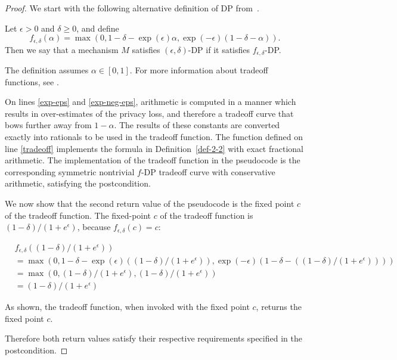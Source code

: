 \documentclass{article}
\begin{document}
\begin{proof}
    We start with the following alternative definition of DP from~\cite{awan2023canonical}.
\begin{definition}
    \label{def-2-2}
    Let $\epsilon > 0$ and $\delta \geq 0$, and define
    \begin{equation}
        f_{\epsilon,\delta}(\alpha) = \max(0, 1 - \delta - \exp(\epsilon) \alpha, \exp(-\epsilon) (1 - \delta - \alpha)).
    \end{equation}
    Then we say that a mechanism $M$ satisfies $(\epsilon, \delta)$-DP if it satisfies $f_{\epsilon,\delta}$-DP.
\end{definition}
The definition assumes $\alpha \in [0, 1]$.
For more information about tradeoff functions, see \cite{awan2023canonical}.

On lines \ref{exp-eps} and \ref{exp-neg-eps},
arithmetic is computed in a manner which results in over-estimates of the privacy loss,
and therefore a tradeoff curve that bows further away from $1 - \alpha$.
The results of these constants are converted exactly into rationals to be used in the tradeoff function.
The function defined on line \ref{tradeoff} implements the formula in Definition~\ref{def-2-2} with exact fractional arithmetic.
The implementation of the tradeoff function in the pseudocode is the corresponding symmetric nontrivial $f$-DP tradeoff curve with conservative arithmetic,
satisfying the postcondition.

We now show that the second return value of the pseudocode is the fixed point $c$ of the tradeoff function.
The fixed-point $c$ of the tradeoff function is $(1 - \delta) / (1 + e^\epsilon)$, because $f_{\epsilon,\delta}(c) = c$:

\begin{align}
    &f_{\epsilon,\delta}((1 - \delta) / (1 + e^\epsilon)) \\
    &= \max(0, 1 - \delta - \exp(\epsilon) ((1 - \delta) / (1 + e^\epsilon)), \exp(-\epsilon) (1 - \delta - ((1 - \delta) / (1 + e^\epsilon)))) \\
    &= \max(0, (1 - \delta) / (1 + e^\epsilon), (1 - \delta) / (1 + e^\epsilon)) \\
    &= (1 - \delta) / (1 + e^\epsilon)
\end{align}

As shown, the tradeoff function, when invoked with the fixed point $c$, returns the fixed point $c$.

Therefore both return values satisfy their respective requirements specified in the postcondition.
\end{proof}

\printbibliography
\end{document}
